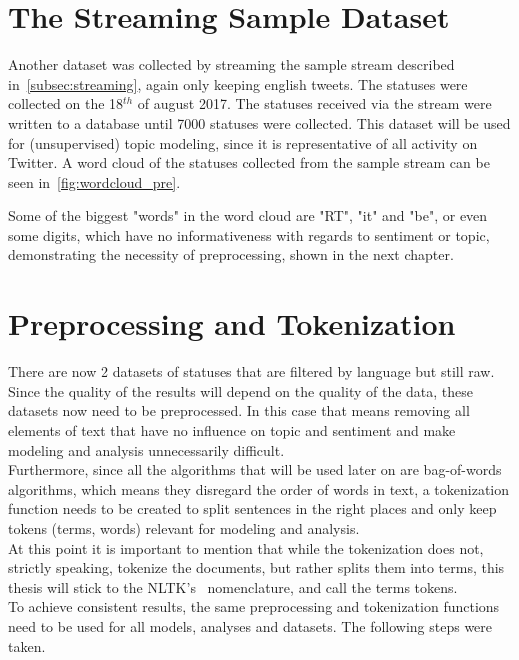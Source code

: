 \section{The Streaming Sample Dataset}
\label{sec:streamingSampleDataset}

Another dataset was collected by streaming the sample stream described in~\cref{subsec:streaming},
again only keeping english tweets.
The statuses were collected on the 18$^{th}$ of august 2017.
The statuses received via the stream were written to a database until 7000 statuses were collected.
This dataset will be used for (unsupervised) topic modeling, since it is representative of all activity on Twitter.
A word cloud of the statuses collected from the sample stream can be seen in~\cref{fig:wordcloud_pre}.

Some of the biggest "words" in the word cloud are "RT", "it" and "be",
or even some digits, which have no informativeness with regards to sentiment or topic,
demonstrating the necessity of preprocessing, shown in the next chapter.

\section{Preprocessing and Tokenization}
\label{sec:preprocessingAndTokenization}

There are now 2 datasets of statuses that are filtered by language but still raw.
Since the quality of the results will depend on the quality of the data,
these datasets now need to be preprocessed.
In this case that means removing all elements of text that have no influence on topic and sentiment and make
modeling and analysis unnecessarily difficult.\\
Furthermore, since all the algorithms that will be used later on are bag-of-words algorithms,
which means they disregard the order of words in text, a tokenization function needs to be created
to split sentences in the right places and only keep tokens (terms, words) relevant for modeling and analysis.\\
At this point it is important to mention that while the tokenization does not, strictly speaking, tokenize the documents,
but rather splits them into terms, this thesis will stick to the NLTK's~\cite{nltkDocs} nomenclature, and call the terms tokens.\\
To achieve consistent results, the same preprocessing and tokenization functions need to be used for all models, analyses and datasets.
The following steps were taken.

